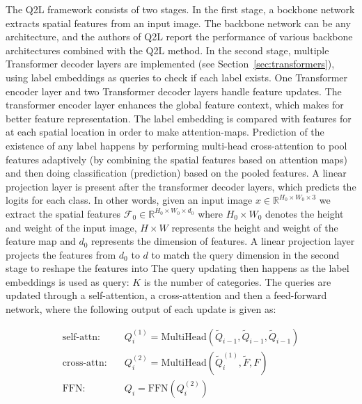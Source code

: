 \documentclass[lettersize,journal]{IEEEtran}
\begin{document}

The Q2L framework consists of two stages. In the first stage, a bockbone network extracts spatial features from an input image. The backbone network can be any architecture, and the authors of Q2L report the performance of various backbone architectures combined with the Q2L method. In the second stage, multiple Transformer decoder layers are implemented (see Section~\ref{sec:transformers}), using label embeddings as queries to check if each label exists. One Transformer encoder layer and two Transformer decoder layers handle feature updates. The transformer encoder layer enhances the global feature context, which makes for better feature representation. The label embedding is compared with features for at each spatial location in order to make attention-maps. Prediction of the existence of any label happens by performing multi-head cross-attention to pool features adaptively (by combining the spatial features based on attention maps) and then doing classification (prediction) based on the pooled features. A linear projection layer is present after the transformer decoder layers, which predicts the logits for each class. In other words, given an input image $x\in \mathbb{R}^{H_0\times W_0\times 3}$ we extract the spatial features $\mathcal{F}_0\in \mathbb{R}^{H_0\times W_0\times d_0}$ where $H_0 \times W_0$ denotes the height and weight of the input image, $H \times W$ represents the height and weight of the feature map and $d_0$ represents the dimension of features. A linear projection layer projects the features from $d_0$ to $d$ to match the query dimension in the second stage to reshape the features into 
The query updating then happens as the label embeddings is used as query: 
$K$ is the number of categories. The queries are updated through a self-attention, a cross-attention and then a feed-forward network, where the following output of each update is given as:

\begin{equation}
    \begin{aligned}
    \text{self-attn:} \quad & Q^{(1)}_i = \text{MultiHead}(\tilde{Q}_{i-1}, \tilde{Q}_{i-1}, \tilde{Q}_{i-1}) \\
    \text{cross-attn:} \quad & Q^{(2)}_i = \text{MultiHead}(\tilde{Q}^{(1)}_i, \tilde{F}, F) \\
    \text{FFN:} \quad & Q_i = \text{FFN}(Q^{(2)}_i)
    \end{aligned}
\end{equation}
\end{document}

